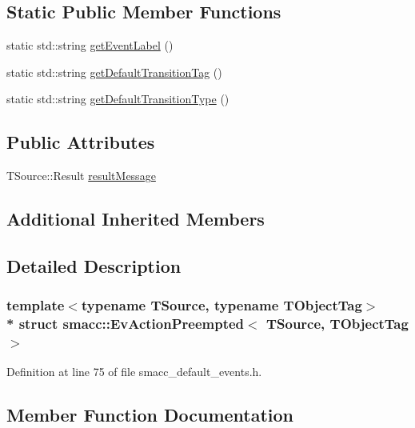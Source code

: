 \subsection*{Static Public Member Functions}
\begin{DoxyCompactItemize}
\item 
static std\+::string \hyperlink{structsmacc_1_1EvActionPreempted_a119a1e5e64588f86219a576721f379c2}{get\+Event\+Label} ()
\item 
static std\+::string \hyperlink{structsmacc_1_1EvActionPreempted_a93a1d4c70eea0581caa028c6cf9c9d38}{get\+Default\+Transition\+Tag} ()
\item 
static std\+::string \hyperlink{structsmacc_1_1EvActionPreempted_a6e316267502ae8001bb1a8eb3be9df57}{get\+Default\+Transition\+Type} ()
\end{DoxyCompactItemize}
\subsection*{Public Attributes}
\begin{DoxyCompactItemize}
\item 
T\+Source\+::\+Result \hyperlink{structsmacc_1_1EvActionPreempted_a6ea7569ccfc3e233b2d786606d01aece}{result\+Message}
\end{DoxyCompactItemize}
\subsection*{Additional Inherited Members}


\subsection{Detailed Description}
\subsubsection*{template$<$typename T\+Source, typename T\+Object\+Tag$>$\\*
struct smacc\+::\+Ev\+Action\+Preempted$<$ T\+Source, T\+Object\+Tag $>$}



Definition at line 75 of file smacc\+\_\+default\+\_\+events.\+h.



\subsection{Member Function Documentation}
